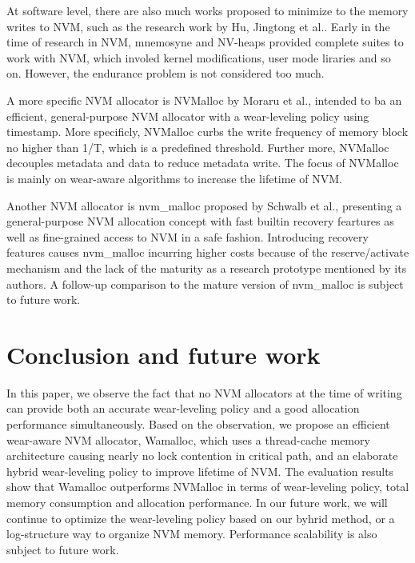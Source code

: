 \documentclass[10pt, conference, compsocconf]{IEEEtran}
\begin{document}
At software level, there are also much works proposed to minimize to the memory writes to NVM, 
such as the research work by Hu, Jingtong et al.\cite{hu2013software}.
Early in the time of research in NVM, mnemosyne\cite{volos2011mnemosyne} and NV-heaps\cite{coburn2011nv} provided complete suites to work with NVM, which involed kernel modifications, user mode liraries and so on.
However, the endurance problem is not considered too much.

A more specific NVM allocator is NVMalloc by Moraru et al.\cite{moraru2013consistent},
intended to ba an efficient, general-purpose NVM allocator with a wear-leveling policy using timestamp.
More specificly, NVMalloc curbs the write frequency of memory block no higher than 1/T, which is a predefined threshold.
Further more, NVMalloc decouples metadata and data to reduce metadata write.
The focus of NVMalloc is mainly on wear-aware algorithms to increase the lifetime of NVM.

Another NVM allocator is nvm\_malloc proposed by Schwalb et al.\cite{schwalbnvm},
presenting a general-purpose NVM allocation concept with fast builtin recovery feartures
as well as fine-grained access to NVM in a safe fashion.
Introducing recovery features causes nvm\_malloc incurring higher costs
because of the reserve/activate mechanism and the lack of the maturity as a research prototype mentioned by its authors.
A follow-up comparison to the mature version of nvm\_malloc is subject to future work.

\section{Conclusion and future work}

In this paper, we observe the fact that
no NVM allocators at the time of writing 
can provide both an accurate wear-leveling policy and a good allocation performance simultaneously.
Based on the observation, we propose an efficient wear-aware NVM allocator, Wamalloc,
which uses a thread-cache memory architecture causing nearly no lock contention in critical path,
and an elaborate hybrid wear-leveling policy to improve lifetime of NVM.
The evaluation results show that
Wamalloc outperforms NVMalloc in terms of wear-leveling policy, total memory consumption and allocation performance.
In our future work, we will continue to optimize the wear-leveling policy based on our byhrid method,
or a log-structure way\cite{rumble2014log} to organize NVM memory.
Performance scalability is also subject to future work.
\end{document}
